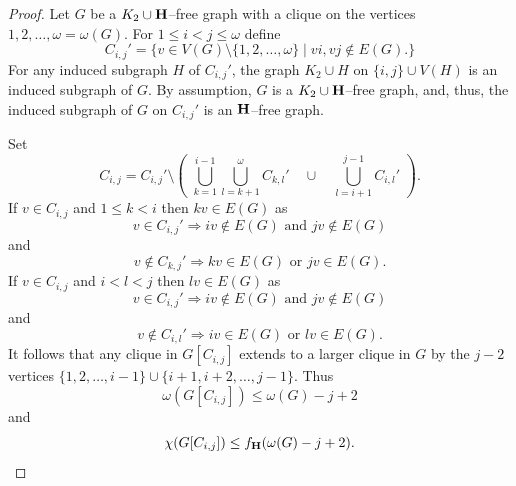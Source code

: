 \documentclass{article}
\theoremstyle{plain}
\theoremstyle{definition}
\begin{document}
\begin{proof}
Let $G$ be a $K_2 \cup {\bf H  } $--free graph with a clique on the vertices $1,2,\ldots, \omega=\omega(G).$
For $1\leq i < j \leq \omega$ define
\[
C_{i,j}' = \{ v\in V(G) \setminus \{1,2,\ldots, \omega\} \mid vi,vj \not\in E(G).  \}
\]
For any induced subgraph $H$ of $C_{i,j}'$, the graph $K_2 \cup H$ on $\{i,j\} \cup V(H)$ is an induced subgraph of $G.$ By assumption, $G$ is a $K_2 \cup {\bf H  } $--free graph, and, thus, the induced subgraph of $G$ on $C_{i,j}' $ is an  ${\bf H  } $--free graph.

Set
\[
C_{i,j} = C_{i,j}' \setminus  \left(\,\, \bigcup_{k=1}^{i-1} \bigcup_{l=k+1}^\omega C_{k,l}'   \quad \cup \quad  \bigcup_{l=i+1}^{j-1} C_{i,l}'  \,\,  \right). 
\]
If $v\in C_{i,j}$ and $1\leq k < i$ then $kv \in E(G)$ as 
\[ v\in C_{i,j}' \Rightarrow iv \not\in E(G) \textrm{ and }  jv \not\in E(G) \]
and
\[ v\not\in C_{k,j}' \Rightarrow kv \in E(G) \textrm{ or }  jv \in E(G). \]
If $v\in C_{i,j}$ and $i< l < j$ then $lv \in E(G)$ as 
\[ v\in C_{i,j}' \Rightarrow iv \not\in E(G) \textrm{ and }  jv \not\in E(G) \]
and
\[ v\not\in C_{i,l}' \Rightarrow iv \in E(G) \textrm{ or }  lv \in E(G). \]
It follows that any clique in $G[C_{i,j}]$ extends to a larger clique in $G$ by the $j-2$ vertices
$\{1,2,\ldots,i-1\} \cup \{ i+1,i+2,\ldots, j-1 \}.$ 
Thus
\[ \omega(G[C_{i,j}]) \leq \omega(G)-j+2\]
and
\[ \chi(G[C_{i,j}]) \leq f_{{\bf H  } }( \omega(G)-j+2 ). \]


\end{proof}
\end{document}
